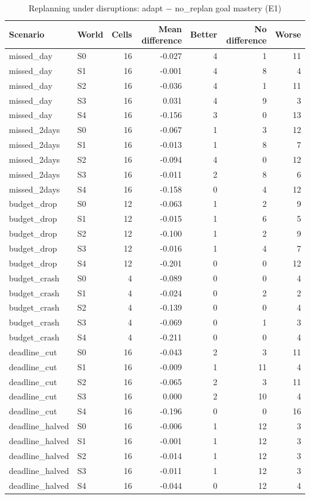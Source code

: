 \begin{table}[htbp]
\centering\small
\caption{Replanning under disruptions: adapt $-$ no\_replan goal mastery (E1)}
\label{tab:t11}
\begin{tabular}{llrrrrr}
\toprule
Scenario & World & Cells & Mean difference & Better & No difference & Worse \\
\midrule
missed\_day & S0 & 16 & -0.027 & 4 & 1 & 11 \\
missed\_day & S1 & 16 & -0.001 & 4 & 8 & 4 \\
missed\_day & S2 & 16 & -0.036 & 4 & 1 & 11 \\
missed\_day & S3 & 16 & 0.031 & 4 & 9 & 3 \\
missed\_day & S4 & 16 & -0.156 & 3 & 0 & 13 \\
missed\_2days & S0 & 16 & -0.067 & 1 & 3 & 12 \\
missed\_2days & S1 & 16 & -0.013 & 1 & 8 & 7 \\
missed\_2days & S2 & 16 & -0.094 & 4 & 0 & 12 \\
missed\_2days & S3 & 16 & -0.011 & 2 & 8 & 6 \\
missed\_2days & S4 & 16 & -0.158 & 0 & 4 & 12 \\
budget\_drop & S0 & 12 & -0.063 & 1 & 2 & 9 \\
budget\_drop & S1 & 12 & -0.015 & 1 & 6 & 5 \\
budget\_drop & S2 & 12 & -0.100 & 1 & 2 & 9 \\
budget\_drop & S3 & 12 & -0.016 & 1 & 4 & 7 \\
budget\_drop & S4 & 12 & -0.201 & 0 & 0 & 12 \\
budget\_crash & S0 & 4 & -0.089 & 0 & 0 & 4 \\
budget\_crash & S1 & 4 & -0.024 & 0 & 2 & 2 \\
budget\_crash & S2 & 4 & -0.139 & 0 & 0 & 4 \\
budget\_crash & S3 & 4 & -0.069 & 0 & 1 & 3 \\
budget\_crash & S4 & 4 & -0.211 & 0 & 0 & 4 \\
deadline\_cut & S0 & 16 & -0.043 & 2 & 3 & 11 \\
deadline\_cut & S1 & 16 & -0.009 & 1 & 11 & 4 \\
deadline\_cut & S2 & 16 & -0.065 & 2 & 3 & 11 \\
deadline\_cut & S3 & 16 & 0.000 & 2 & 10 & 4 \\
deadline\_cut & S4 & 16 & -0.196 & 0 & 0 & 16 \\
deadline\_halved & S0 & 16 & -0.006 & 1 & 12 & 3 \\
deadline\_halved & S1 & 16 & -0.001 & 1 & 12 & 3 \\
deadline\_halved & S2 & 16 & -0.014 & 1 & 12 & 3 \\
deadline\_halved & S3 & 16 & -0.011 & 1 & 12 & 3 \\
deadline\_halved & S4 & 16 & -0.044 & 0 & 12 & 4 \\
\bottomrule
\end{tabular}
\end{table}
